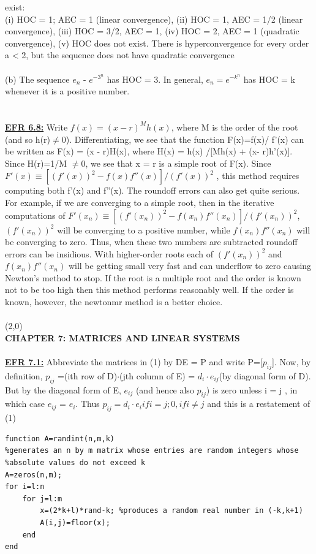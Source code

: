 \documentclass[../main.tex]{subfiles}
\begin{document}
exist:
\\
(i) HOC = 1; AEC = 1 (linear convergence), (ii) HOC = 1, AEC = 1/2 (linear convergence), (iii) 
HOC = 3/2, AEC = 1, (iv) HOC = 2, AEC = 1 (quadratic convergence), (v) HOC does not exist. 
There is hyperconvergence for every order a < 2, but the sequence does not have quadratic 
convergence
\\
\\
(b) The sequence $e_n$ - $e^{-3^n}$
 has HOC = 3. In general, $e_n = e^{-k^n}$
 has HOC = k whenever it is a positive 
number. 
\\
\\
\\
\textbf{\underline{EFR 6.8:}} Write $f(x) = (x-r)^Mh(x)$, where M is the order of the root (and so h(r)$\neq$0). 
Differentiating, we see that the function F(x)=f(x)/ f'(x) can be written as F(x) = (x - r)H(x), 
where H(x) = h(x) /[Mh(x) + (x- r)h'(x)]. Since H(r)=1/M $\neq$0, we see that x = r is a simple root 
of F(x). Since $F'(x)\equiv[(f'(x))^2-f(x)f''(x)]/(f'(x))^2$
, this method requires computing both 
f'(x) and f''(x). The roundoff errors can also get quite serious. For example, if we are converging to a simple root, then in the iterative computations of $F'(x_n)\equiv[(f'(x_n))^2-f(x_n)f''(x_n)]/(f'(x_n))^2$, 
$(f'(x_n))^2$ will be converging to a positive number, while $f(x_n)f''(x_n)$ will be converging to zero. 
Thus, when these two numbers are subtracted roundoff errors can be insidious. With higher-order roots 
each of $(f'(x_n))^2$
 and $f(x_n)f''(x_n)$ will be getting small very fast and can underflow to zero causing 
Newton's method to stop. If the root is a multiple root and the order is known not to be too high then 
this method performs reasonably well. If the order is known, however, the newtonmr method is a 
better choice. 
\\
\\
\line(2,0){\textwidth}\\
\textbf{CHAPTER 7: MATRICES AND LINEAR SYSTEMS }
\\
\\
\textbf{\underline{EFR 7.1:}} Abbreviate the matrices in (1) by DE = P and write P=[$p_{ij}$]. Now, by definition, 
$p_{ij}$ =(ith row of D)$\cdot$(jth column of E) = $d_i\cdot e_{ij}$(by diagonal form of D). But by the diagonal form of 
E, $e_{ij}$ (and hence also $p_{ij}$) is zero unless i = j , in which case $e_{ij}$ = $e_{i}$. Thus $p_{ij}= d_i\cdot e_{i} if i=j; 0, if i\neq j$ and this is a restatement of (1)
\begin{lstlisting}[numbers=none]
function A=randint(n,m,k)  
%generates an n by m matrix whose entries are random integers whose 
%absolute values do not exceed k 
A=zeros(n,m); 
for i=l:n 
	for j=l:m 
		x=(2*k+l)*rand-k; %produces a random real number in (-k,k+1)
		A(i,j)=floor(x);
	end 
end 
\end{lstlisting}
\end{document}
